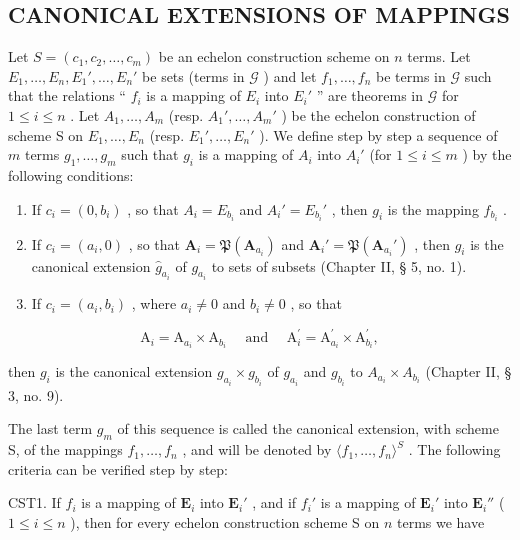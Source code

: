 \subsection{CANONICAL EXTENSIONS OF MAPPINGS}

Let \(S = (c_1, c_2, \ldots, c_m)\) be an echelon construction scheme on \(n\) terms. Let \(E_1, \ldots, E_n, E_1', \ldots, E_n'\) be sets (terms in \(\mathcal{G}\) ) and let \(f_1, \ldots, f_n\) be terms in \(\mathcal{G}\) such that the relations `` \(f_i\) is a mapping of \(E_i\) into \(E_i'\) '' are theorems in \(\mathcal{G}\) for \(1 \leqslant i \leqslant n\) . Let \(A_1, \ldots, A_m\) (resp. \(A_1', \ldots, A_m'\) ) be the echelon construction of scheme S on \(E_1, \ldots, E_n\) (resp. \(E_1', \ldots, E_n'\) ). We define step by step a sequence of \(m\) terms \(g_1, \ldots, g_m\) such that \(g_i\) is a mapping of \(A_i\) into \(A_i'\) (for \(1 \leqslant i \leqslant m\) ) by the following conditions:

\begin{enumerate}
\def\labelenumi{(\alph{enumi})}
\item
  If \(c_{i} = (0, b_{i})\) , so that \(A_{i} = E_{b_{i}}\) and \(A_{i}' = E_{b_{i}}'\) , then \(g_{i}\) is the mapping \(f_{b_{i}}\) .
\item
  If \(c_{i} = (a_{i}, 0)\) , so that \(\mathbf{A}_{i} = \mathfrak{P}(\mathbf{A}_{a_{i}})\) and \(\mathbf{A}_{i}' = \mathfrak{P}(\mathbf{A}_{a_{i}}')\) , then \(g_{i}\) is the canonical extension \(\hat{g}_{a_i}\) of \(g_{a_i}\) to sets of subsets (Chapter II, § 5, no. 1).
\item
  If \(c_{i} = (a_{i}, b_{i})\) , where \(a_{i} \neq 0\) and \(b_{i} \neq 0\) , so that
\end{enumerate}

\[
\mathrm{A} _ {i} = \mathrm{A} _ {a _ {i}} \times \mathrm{A} _ {b _ {i}} \quad \text { and } \quad \mathrm{A} _ {i} ^ {\prime} = \mathrm{A} _ {a _ {i}} ^ {\prime} \times \mathrm{A} _ {b _ {i}} ^ {\prime},
\]

then \(g_{i}\) is the canonical extension \(g_{a_i} \times g_{b_i}\) of \(g_{a_i}\) and \(g_{b_i}\) to \(A_{a_i} \times A_{b_i}\) (Chapter II, § 3, no. 9).

The last term \(g_{m}\) of this sequence is called the canonical extension, with scheme S, of the mappings \(f_{1}, \ldots, f_{n}\) , and will be denoted by \(\langle f_{1}, \ldots, f_{n} \rangle^{S}\) . The following criteria can be verified step by step:

CST1. If \(f_{i}\) is a mapping of \(\mathbf{E}_i\) into \(\mathbf{E}_i'\) , and if \(f_{i}'\) is a mapping of \(\mathbf{E}_i'\) into \(\mathbf{E}_i''\) ( \(1 \leqslant i \leqslant n\) ), then for every echelon construction scheme S on \(n\) terms we have

